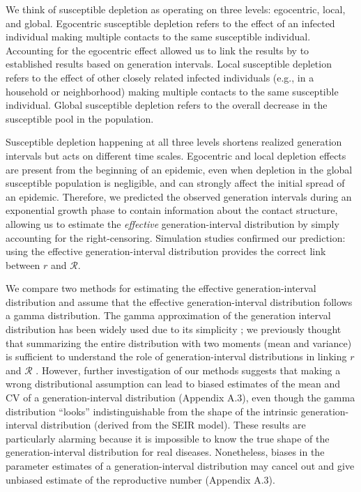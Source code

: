 \documentclass[12pt]{article}
\newcommand{\RR}{\ensuremath{{\mathcal R}}}
\begin{document}
We think of susceptible depletion as operating on three levels: egocentric, local, and global.
Egocentric susceptible depletion refers to the effect of an infected individual making multiple contacts to the same susceptible individual.
Accounting for the egocentric effect allowed us to link the results by \cite{trapman2016inferring} to established results based on generation intervals.
Local susceptible depletion refers to the effect of other closely related infected individuals (e.g., in a household or neighborhood) making multiple contacts to the same susceptible individual.
Global susceptible depletion refers to the overall decrease in the susceptible pool in the population.

Susceptible depletion happening at all three levels shortens realized generation intervals but acts on different time scales.
Egocentric and local depletion effects are present from the beginning of an epidemic, even when depletion in the global susceptible population is negligible, and can strongly affect the initial spread of an epidemic.
Therefore, we predicted the observed generation intervals during an exponential growth phase to contain information about the contact structure, allowing us to estimate the \emph{effective} generation-interval distribution by simply accounting for the right-censoring.
Simulation studies confirmed our prediction: using the effective generation-interval distribution provides the correct link between $r$ and $\RR$.

We compare two methods for estimating the effective generation-interval distribution and assume that the effective generation-interval distribution follows a gamma distribution.
The gamma approximation of the generation interval distribution has been widely used due to its simplicity \citep{mcbryde2009early, nishiura2009transmission, roberts2011early, trichereau2012estimation, nishiura2015theoretical};
we previously thought that summarizing the entire distribution with two moments (mean and variance) is sufficient to understand the role of generation-interval distributions in linking $r$ and $\RR$ \citep{park2019practical}.
However, further investigation of our methods suggests that making a wrong distributional assumption can lead to biased estimates of the mean and CV of a generation-interval distribution (Appendix A.3), even though the gamma distribution ``looks'' indistinguishable from the shape of the intrinsic generation-interval distribution (derived from the SEIR model).
These results are particularly alarming because it is impossible to know the true shape of the generation-interval distribution for real diseases.
Nonetheless, biases in the parameter estimates of a generation-interval distribution may cancel out and give unbiased estimate of the reproductive number (Appendix A.3).
\end{document}
